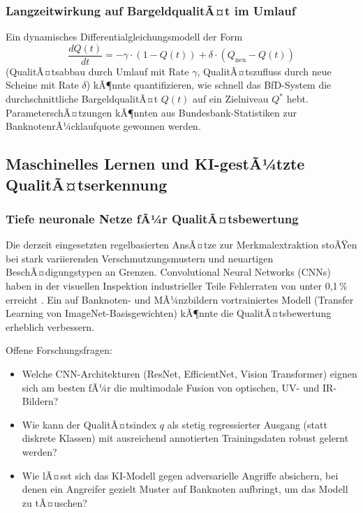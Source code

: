 ﻿\documentclass[a4paper,12pt]{article}
\theoremstyle{definition}
\begin{document}
\subsubsection{Langzeitwirkung auf BargeldqualitÃ¤t im Umlauf}

Ein dynamisches Differentialgleichungsmodell der Form
\[
\frac{dQ(t)}{dt} = -\gamma \cdot (1 - Q(t)) + \delta \cdot (Q_{\text{neu}} - Q(t))
\]
(QualitÃ¤tsabbau durch Umlauf mit Rate $\gamma$, QualitÃ¤tszufluss durch neue
Scheine mit Rate $\delta$) kÃ¶nnte quantifizieren, wie schnell das BfD-System
die durchschnittliche BargeldqualitÃ¤t $Q(t)$ auf ein Zielniveau $Q^*$ hebt.
ParameterschÃ¤tzungen kÃ¶nnten aus Bundesbank-Statistiken zur BanknotenrÃ¼cklaufquote
gewonnen werden.

\subsection{Maschinelles Lernen und KI-gestÃ¼tzte QualitÃ¤tserkennung}

\subsubsection{Tiefe neuronale Netze fÃ¼r QualitÃ¤tsbewertung}

Die derzeit eingesetzten regelbasierten AnsÃ¤tze zur Merkmalextraktion
stoÃŸen bei stark variierenden Verschmutzungsmustern und neuartigen
BeschÃ¤digungstypen an Grenzen.  Convolutional Neural Networks (CNNs)
haben in der visuellen Inspektion industrieller Teile Fehlerraten
von unter 0{,}1\,\% erreicht \cite{lecun2015}.
Ein auf Banknoten- und MÃ¼nzbildern vortrainiertes Modell (Transfer Learning
von ImageNet-Basisgewichten) kÃ¶nnte die QualitÃ¤tsbewertung erheblich verbessern.

Offene Forschungsfragen:
\begin{itemize}
  \item Welche CNN-Architekturen (ResNet, EfficientNet, Vision Transformer)
        eignen sich am besten fÃ¼r die multimodale Fusion von optischen,
        UV- und IR-Bildern?
  \item Wie kann der QualitÃ¤tsindex $q$ als stetig regressierter Ausgang
        (statt diskrete Klassen) mit ausreichend annotierten Trainingsdaten
        robust gelernt werden?
  \item Wie lÃ¤sst sich das KI-Modell gegen adversarielle Angriffe absichern,
        bei denen ein Angreifer gezielt Muster auf Banknoten aufbringt,
        um das Modell zu tÃ¤uschen?
\end{itemize}
\end{document}

